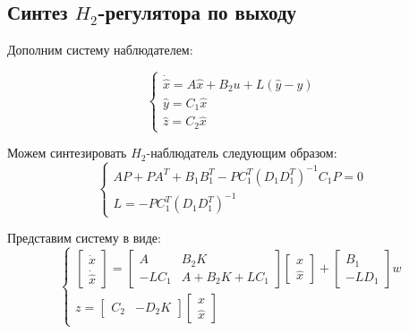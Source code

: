 \subsection{Синтез $H_2$-регулятора по выходу}

Дополним систему наблюдателем:

\begin{equation}
    \begin{cases}
        \dot{\hat{x}} = A\hat{x} + B_2u + L(\hat{y} - y)\\
        \hat{y} = C_1\hat{x} \\
        \hat{z} = C_2\hat{x}
    \end{cases}
\end{equation}

Можем синтезировать $H_2$-наблюдатель следующим образом:
\begin{equation}
    \begin{cases}
        AP + PA^T + B_1B_1^T - PC_1^T(D_1D_1^T)^{-1}C_1P = 0\\
        L = -PC_1^T(D_1D_1^T)^{-1}
    \end{cases}
\end{equation}

Представим систему в виде:
\begin{equation}
    \begin{cases}
        \begin{bmatrix}
            \dot{x} \\
            \dot{\hat{x}}
        \end{bmatrix} =
        \begin{bmatrix}
            A & B_2K \\
            -LC_1 & A + B_2K + LC_1
        \end{bmatrix}
        \begin{bmatrix}
            x \\
            \hat{x}
        \end{bmatrix} +
        \begin{bmatrix}
            B_1 \\ -LD_1 
        \end{bmatrix}w \\

        z = \begin{bmatrix}
            C_2 & -D_2K
        \end{bmatrix}
        \begin{bmatrix}
            x \\
            \hat{x}
        \end{bmatrix}
    \end{cases}
\end{equation}

